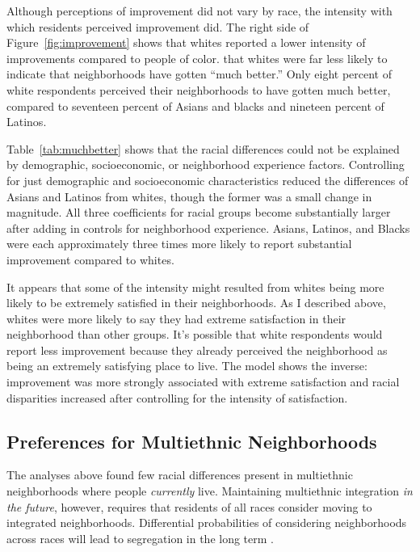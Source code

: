 \documentclass[11pt]{baderart}
\begin{document}

Although perceptions of improvement did not vary by race, the intensity with which residents perceived improvement did. The right side of Figure~\ref{fig:improvement} shows that whites reported a lower intensity of improvements compared to people of color. that whites were far less likely to indicate that neighborhoods have gotten ``much better.'' Only eight percent of white respondents perceived their neighborhoods to have gotten much better, compared to seventeen percent of Asians and blacks and nineteen percent of Latinos. 


Table~\ref{tab:muchbetter} shows that the racial differences could not be explained by demographic, socioeconomic, or neighborhood experience factors. Controlling for just demographic and socioeconomic characteristics reduced the differences of Asians and Latinos from whites, though the former was a small change in magnitude. All three coefficients for racial groups become substantially larger after adding in controls for neighborhood experience. Asians, Latinos, and Blacks were each approximately three times more likely to report substantial improvement compared to whites. 


It appears that some of the intensity might resulted from whites being more likely to be extremely satisfied in their neighborhoods. As I described above, whites were more likely to say they had extreme satisfaction in their neighborhood than other groups. It's possible that white respondents would report less improvement because they already perceived the neighborhood as being an extremely satisfying place to live. The model shows the inverse: improvement was more strongly associated with extreme satisfaction and racial disparities increased after controlling for the intensity of satisfaction. 

\subsection{Preferences for Multiethnic Neighborhoods}
The analyses above found few racial differences present in multiethnic neighborhoods where people \emph{currently} live. Maintaining multiethnic integration \emph{in the future}, however, requires that residents of all races consider moving to integrated neighborhoods. Differential probabilities of considering neighborhoods across races will lead to segregation in the long term \citep{bader_fragmented_2016, krysan_cycle_2017}.
\end{document}
